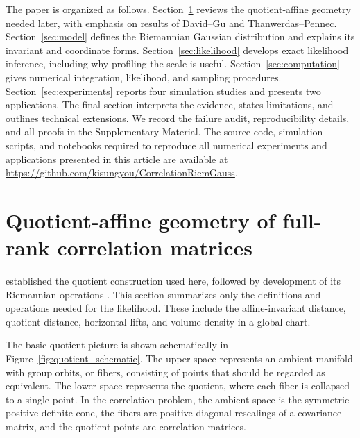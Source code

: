 \documentclass[
  12pt]{article}
\begin{document}
The paper is organized as follows. Section~\ref{sec:geometry} reviews the quotient-affine geometry needed later, with emphasis on results of David--Gu and Thanwerdas--Pennec. Section~\ref{sec:model} defines the Riemannian Gaussian distribution and explains its invariant and coordinate forms. Section~\ref{sec:likelihood} develops exact likelihood inference, including why profiling the scale is useful. Section~\ref{sec:computation} gives numerical integration, likelihood, and sampling procedures. Section~\ref{sec:experiments} reports four simulation studies and presents two applications. The final section interprets the evidence, states limitations, and outlines technical extensions. We record the failure audit, reproducibility details, and all proofs in the Supplementary Material. The source code, simulation scripts, and notebooks required to reproduce
all numerical experiments and applications presented in this article are available at \url{https://github.com/kisungyou/CorrelationRiemGauss}.


\section{Quotient-affine geometry of full-rank correlation matrices}\label{sec:geometry}


\citet{david_2019_RiemannianStructureCorrelation} established the quotient construction used here, followed by development of its Riemannian operations  \citep{thanwerdas_2021_GeodesicQuotientAffineMetrics,thanwerdas_2021_GeodesicsCurvatureQuotientAffine}. This section summarizes only the definitions and operations needed for the likelihood. These include the affine-invariant distance, quotient distance, horizontal lifts, and volume density in a global chart. 


The basic quotient picture is shown schematically in Figure~\ref{fig:quotient_schematic}. The upper space represents an ambient manifold with group orbits, or fibers, consisting of points that should be regarded as equivalent. The lower space represents the quotient, where each fiber is collapsed to a single point. In the correlation problem, the ambient space is the symmetric positive definite cone, the fibers are positive diagonal rescalings of a covariance matrix, and the quotient points are correlation matrices.
\end{document}

